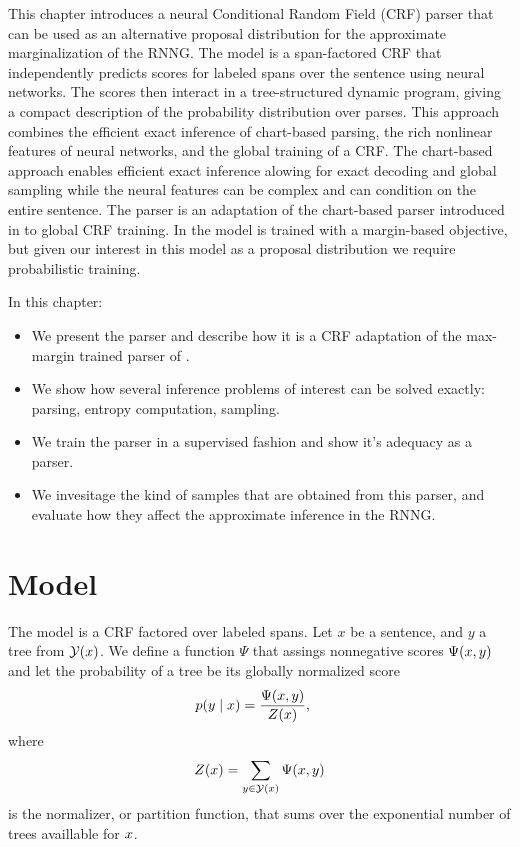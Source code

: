 % 

This chapter introduces a neural Conditional Random Field (CRF) parser that can be used as an alternative proposal distribution for the approximate marginalization of the RNNG. The model is a span-factored CRF that independently predicts scores for labeled spans over the sentence using neural networks. The scores then interact in a tree-structured dynamic program, giving a compact description of the probability distribution over parses. This approach combines the efficient exact inference of chart-based parsing, the rich nonlinear features of neural networks, and the global training of a CRF. The chart-based approach enables efficient exact inference alowing for exact decoding and global sampling while the neural features can be complex and can condition on the entire sentence. The parser is an adaptation of the chart-based parser introduced in \citet{stern2017minimal} to global CRF training. In \citet{stern2017minimal} the model is trained with a margin-based objective, but given our interest in this model as a proposal distribution we require probabilistic training.

In this chapter:
\begin{itemize}
  \item We present the parser and describe how it is a CRF adaptation of the max-margin trained parser of \citet{stern2017minimal}.
  \item We show how several inference problems of interest can be solved exactly: parsing, entropy computation, sampling.
  \item We train the parser in a supervised fashion and show it's adequacy as a parser.
  \item We invesitage the kind of samples that are obtained from this parser, and evaluate how they affect the approximate inference in the RNNG.
\end{itemize}

\section{Model}
  The model is a CRF factored over labeled spans. Let $x$ be a sentence, and $y$ a tree from $\mathcal{Y}(x)$. We define a function $\Psi$ that assings nonnegative scores $\Psi(x, y)$ and let the probability of a tree be its globally normalized score
  \begin{align}
    \label{eq:crf-model}
    p(y \mid x) &= \frac{\Psi(x, y)}{Z(x)},
  \end{align}
  where
  \begin{align*}
    Z(x) = \sum_{ y \in \mathcal{Y}(x) } \Psi(x, y)
  \end{align*}
  is the normalizer, or partition function, that sums over the exponential number of trees availlable for $x$.

